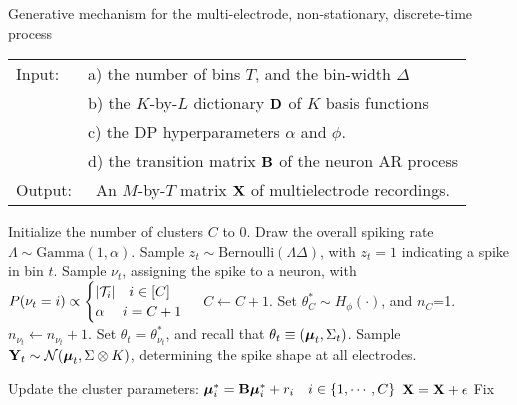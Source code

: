 \begin{algorithm}
\caption{Generative mechanism for the multi-electrode, non-stationary, discrete-time process}\label{alg:gen_proc}
\begin{tabular}{p{1.2cm}p{12.4cm}}
Input:&  a) the number of bins $T$, and the bin-width $\Delta$\\
  &  b) the $K$-by-$L$ dictionary $\mathbf{D}$ of $K$ basis functions\\
  &  c) the DP hyperparameters $\alpha$ and $\phi$.\\ 
  &  d) the transition matrix $\mathbf{B}$ of the neuron AR process \\
Output:& \  An $M$-by-$T$ matrix $\mathbf{X}$ of multielectrode recordings. %
\end{tabular}
\begin{algorithmic}[1]
\State Initialize the number of clusters $C$ to $0$.
\State Draw the overall spiking rate $\Lambda \sim \text{Gamma}(1,\alpha)$.
\State Sample $z_t \sim \text{Bernoulli}(\Lambda \Delta)$, with $z_t = 1$ indicating a spike in bin $t$.
   \label{enum:thin}
  \State Sample $\nu_t$, assigning the spike to a neuron, with
$  P({\nu_t} = i) \propto 
  \begin{cases}
   |\mathcal{T}_i| \quad i \in [C] \\
   \alpha \quad\ i = C + 1 \\
  \end{cases}$
          \State  $C \leftarrow C + 1$. 
		\State Set $\theta^*_{C} \sim H_{\phi}(\cdot)$, and $n_C$=1.
       \Else \State  $n_{\nu_t} \leftarrow n_{\nu_t}+1$.
    \EndIf
\State Set $\theta_t = \theta^*_{\nu_t}$, and recall that $\theta_t \equiv (\boldsymbol{\mu}_t, \Sigma_t)$.
\State Sample $\bY_t %
           \sim \mathcal{N}(\mb{\mu}_t, \Sigma \otimes K)$, determining the spike shape at all electrodes. 
\EndIf

\State Update the cluster parameters: ${\boldsymbol{\mu}}^*_i = \mathbf{B} {\boldsymbol{\mu}}^*_i + r_i \quad i \in \{1, \cdots, C\}$
\EndFor
\State $\mathbf{X} = \mathbf{X} + \mathbf{\epsilon}$ {\color{green} Fix}
\State {}
\end{algorithmic}
\end{algorithm}

